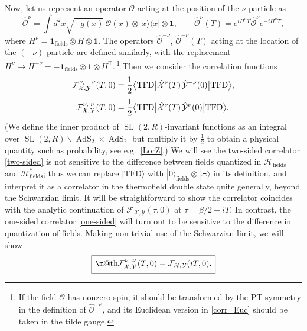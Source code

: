 \documentclass[12pt]{article}
\makeatletter
\newcommand*{\wideboxed}[1]{\setlength{\fboxsep}{1ex}%
  \fbox{\m@th$\displaystyle#1$}}
\newcommand{\blangle}{\bigl\langle}
\newcommand{\brangle}{\bigr\rangle}
\newcommand*{\bra}[1]{\langle{#1}|}
\newcommand*{\ket}[1]{|{#1}\rangle}
\newcommand*{\bbra}[1]{\blangle{#1}\big|}
\newcommand*{\bket}[1]{\big|{#1}\brangle}
\newcommand{\calF}{\mathcal{F}}
\newcommand{\calH}{\mathcal{H}}
\newcommand{\calO}{\mathcal{O}}
\newcommand{\calX}{\mathcal{X}}
\newcommand{\calY}{\mathcal{Y}}
\newcommand{\RR}{\mathbb{R}}
\newcommand{\Tt}{\mathrm{T}}
\DeclareMathOperator{\tSL}{\widetilde{\mathrm{SL}}}
\DeclareMathOperator{\tAdS}{\widetilde{AdS}}
\newcommand{\TFD}{\mathrm{TFD}}
\newcommand{\unit}{\mathbf{1}}
\def\eg{e.g.\ }
\def\widetilde#1{#1}%
\def\RR{R}
\makeatother
\begin{document}
Now, let us represent an operator $\calO$ acting at the position of the $\nu$-particle as
\begin{equation}\label{O_R}
\hat{\calO}^{\nu}
=\int d^2x \sqrt{-g(x)}\, \calO(x)\otimes \ket{x}\bra{x}\otimes \unit,\qquad
\hat{\calO}^{\nu}(T)=e^{iH^{\nu}T}\hat{\calO}^{\nu}e^{-iH^{\nu}T},
\end{equation}
where $H^{\nu}=\unit_{\text{fields}}\otimes H\otimes \unit$. The operators $\hat{\calO}^{-\nu}$, $\hat{\calO}^{-\nu}(T)$ acting at the location of the $(-\nu)$-particle are defined similarly, with the replacement $H^{\nu}\to H^{-\nu}=-\unit_{\text{fields}}\otimes \unit\otimes H^{\Tt}$.\,\footnote{If the field $\calO$ has nonzero spin, it should be transformed by the PT symmetry in the definition of $\hat{\calO}^{-\nu}$, and its Euclidean version in \eqref{corr_Euc} should be taken in the tilde gauge.} Then we consider the correlation functions
\begin{align}
\label{two-sided}
\tensor*{\calF}{*^{\nu,}_{\calX,}^{-\nu}_{\calY}}(T,0)
&=\frac{1}{2}\bbra{\TFD}\hat{\calX}^{\nu}(T)\kern1pt
\hat{\calY}^{-\nu}(0)\bket{\TFD},
\\[3pt]
\label{one-sided}
\tensor*{\calF}{*^{\nu,}_{\calX,}^{\nu}_{\calY}}(T,0)
&=\frac{1}{2}\bbra{\TFD}\hat{\calX}^{\nu}(T)\kern1pt
\hat{\calY}^{\nu}(0)\bket{\TFD}.
\end{align}
(We define the inner product of $\tSL(2,\RR)$-invariant functions as an integral over $\tSL(2,\RR)\backslash\tAdS_2\times\tAdS_2$ but multiply it by $\frac{1}{2}$ to obtain a physical quantity such as probability, see \eg \eqref{LorZ}.) We will see the two-sided correlator \eqref{two-sided} is not sensitive to the difference between fields quantized in $\calH_{\text{fields}}$ and $\calH_{\text{fields}}^*$;  thus we can replace $\ket{\text{TFD}}$ with $\ket{0}_{\text{fields}}\otimes \ket{\Xi}$ in its definition, and interpret it as a correlator in the thermofield double state quite generally, beyond the Schwarzian limit. It will be straightforward to show the correlator coincides with the analytic continuation of $\calF_{\calX,\calY}(\tau,0)$ at $\tau=\beta/2+iT$. In contrast, the one-sided correlator \eqref{one-sided} will turn out to be sensitive to the difference in quantization of fields. Making non-trivial use of the Schwarzian limit, we will show
\begin{equation}\label{ts-Euc}
\wideboxed{
\tensor*{\calF}{*^{\nu,}_{\calX,}^{\nu}_{\calY}}(T,0)
=\calF_{\calX,\calY}(iT,0).
}
\end{equation}
\end{document}
